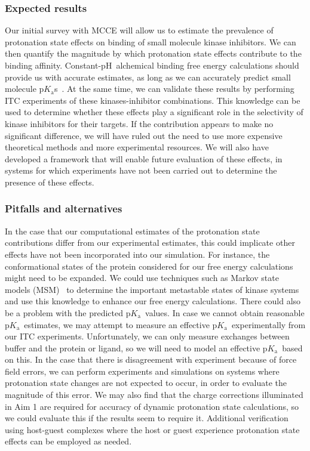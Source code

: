 \documentclass[10pt,final]{article}
\newcommand{\pKa}{p$K_\mathrm{a}$\ }
\newcommand{\pH}{p$\mathrm{H}$\ }
\newcommand{\pKas}{p$K_\mathrm{a}$s\ }
\begin{document}
\subsubsection*{Expected results}
Our initial survey with MCCE will allow us to estimate the prevalence of protonation state effects on binding of small molecule kinase inhibitors. 
%
We can then quantify the magnitude by which protonation state effects contribute to the binding affinity.
%
Constant-\pH alchemical binding free energy calculations should provide us with accurate estimates, as long as we can accurately predict small molecule \pKas. 
%
At the same time, we can validate these results by performing ITC experiments of these kinases-inhibitor combinations.
%
This knowledge can be used to determine whether these effects play a significant role in the selectivity of kinase inhibitors for their targets.
%
If the contribution appears to make no significant difference, we will have ruled out the need to use more expensive theoretical methods and more experimental resources.
%
We will also have developed a framework that will enable future evaluation of these effects, in systems for which experiments have not been carried out to determine the presence of these effects.


\subsubsection*{Pitfalls and alternatives}
In the case that our computational estimates of the protonation state contributions differ from our experimental estimates, this could implicate other effects have not been incorporated into our simulation. 
%
For instance, the conformational states of the protein considered for our free energy calculations might need to be expanded.
%
We could use techniques such as Markov state models (MSM)~\autocite{Prinz2011a} to determine the important metastable states of kinase systems and use this knowledge to enhance our free energy calculations.
%
There could also be a problem with the predicted \pKa values.
%
In case we cannot obtain reasonable \pKa estimates, we may attempt to measure an effective \pKa experimentally from our ITC experiments.
%
Unfortunately, we can only measure exchanges between buffer and the protein or ligand, so we will need to model an effective \pKa based on this.
%
In the case that there is disagreement with experiment because of force field errors, we can perform experiments and simulations on systems where protonation state changes are not expected to occur, in order to evaluate the magnitude of this error.
%
We may also find that the charge corrections illuminated in Aim 1 are required for accuracy of dynamic protonation state calculations, so we could evaluate this if the results seem to require it.
%
Additional verification using host-guest complexes where the host or guest experience protonation state effects can be employed as needed.
\end{document}
